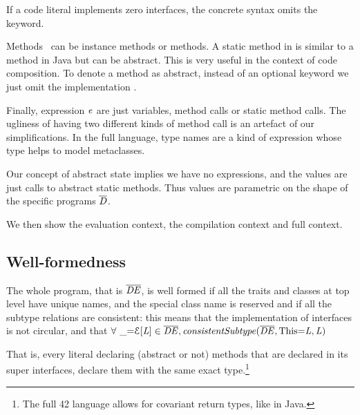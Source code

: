 \noindent If a code literal implements zero interfaces, the concrete syntax omits the \Q@implements@ keyword.

Methods \mMD~can be instance methods or \Q@static@ methods. 
A static method in \name is similar to a \Q@static@ method in Java but can be abstract.
This is very useful in the context of code composition.
To denote a method as abstract, instead of an optional keyword we just omit the implementation \me.

Finally, expression $\mathit{e}$ are just variables, method calls or static method calls.
The ugliness of having two different kinds of method call is an artefact of our simplifications.
In the full language, type names are a kind of expression whose type helps to model metaclasses.

Our concept of abstract state implies we have no \Q@new@ expressions, and
the values are just calls to abstract static methods.
Thus values are parametric on the shape of the specific programs $\overline{\mathit{D}}$.

We then show the evaluation context, the compilation context and full context.

\subsection{Well-formedness}

The whole program, that is $\overline{\mathit{DE}}$, is well formed if
all the traits and classes at top level have unique names, and the special class name
\Q@This@ is reserved and if all
the subtype relations are consistent:
this means that the implementation of interfaces is not circular,
and that $\forall\ \_\terminalCode{=}\ctx[\mL]\in\overline\mDE, \mathit{consistentSubtype}(\overline\mDE,\terminalCode{This=}\mL,\mL)$

\noindent That is, every literal declaring (abstract or not) methods that are declared in its super interfaces, declare them with the same exact type.\footnote{The full 42 language allows for covariant return types, like in Java.}



